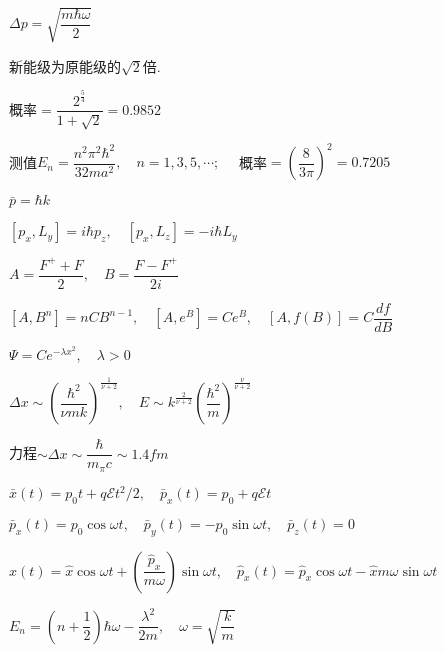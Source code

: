   $ \Delta p=\sqrt{\dfrac{m\hbar\omega}{2}} $

\answer 新能级为原能级的$\sqrt{2}$倍.

  概率$ =\dfrac{2^{\frac{5}{4}}}{1+\sqrt{2}}=\num{0.9852} $

\answer 测值$ E_{n}=\dfrac{n^{2}\pi^{2}\hbar^{2}}{32ma^{2}},\quad n=1,3,5,\cdots;\quad $ 概率$ =\left(\dfrac{8}{3\pi}\right)^{2}=\num{0.7205} $


\answer $ \bar{p}=\hbar k $

\answer $ [p_{x},L_{y}]=i\hbar p_{z},\quad [p_{x},L_{z}]=-i\hbar L_{y} $


\answer $ A=\dfrac{F^{+}+F}{2},\quad B=\dfrac{F-F^{+}}{2i} $


\answer $ [A,B^{n}]=nCB^{n-1},\quad [A,e^{B}]=Ce^{B},\quad [A,f(B)]=C\dfrac{df}{dB} $


\answer $\varPsi=Ce^{-\lambda x^{2}},\quad \lambda>0 $


\answer $ \Delta x\sim\left(\dfrac{\hbar^{2}}{\nu mk}\right)^{\frac{1}{\nu+2}},\quad E\sim k^{\frac{2}{\nu+2}}\left(\dfrac{\hbar^{2}}{m}\right)^{\frac{\nu}{\nu+2}} $

\answer 力程$\sim\Delta x\sim\dfrac{\hbar}{m_{\pi}c}\sim \num{1.4}\si{fm}$

\answer $\bar{x}(t)=p_{0}t+q\mathscr{E}t^{2}/2,\quad \bar{p}_{x}(t)=p_{0}+q\mathscr{E}t$

\answer $ \bar{p}_{x}(t)=p_{0}\cos\omega t,\quad \bar{p}_{y}(t)=-p_{0}\sin\omega t,\quad \bar{p}_{z}(t)=0 $

\answer $\hat{x}(t)=\hat{x}\cos\omega t+\left(\dfrac{\hat{p}_{x}}{m\omega}\right)\sin\omega t,\quad \hat{p}_{x}(t)=\hat{p}_{x}\cos\omega t-\hat{x}m\omega\sin\omega t$


\answer $ E_{n}=\left(n+\dfrac{1}{2}\right)\hbar\omega-\dfrac{\lambda^{2}}{2m},\quad \omega=\sqrt{\dfrac{k}{m}} $

